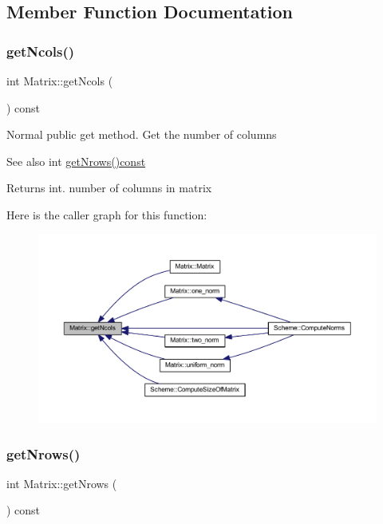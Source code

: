 \subsection{Member Function Documentation}
\mbox{\label{class_matrix_ae0a5f2154953b8d129a90b04f91d9079}} 
\subsubsection{\texorpdfstring{get\+Ncols()}{getNcols()}}
{\footnotesize\ttfamily int Matrix\+::get\+Ncols (\begin{DoxyParamCaption}{ }\end{DoxyParamCaption}) const}

Normal public get method. Get the number of columns \begin{DoxySeeAlso}{See also}
int \mbox{\hyperlink{class_matrix_a711f84a1c62832d9d197d78c9855a276}{get\+Nrows()const}} 
\end{DoxySeeAlso}
\begin{DoxyReturn}{Returns}
int. number of columns in matrix 
\end{DoxyReturn}
Here is the caller graph for this function\+:
\nopagebreak
\begin{figure}[H]
\begin{center}
\leavevmode
\includegraphics[width=350pt]{class_matrix_ae0a5f2154953b8d129a90b04f91d9079_icgraph}
\end{center}
\end{figure}
\mbox{\label{class_matrix_a711f84a1c62832d9d197d78c9855a276}} 
\subsubsection{\texorpdfstring{get\+Nrows()}{getNrows()}}
{\footnotesize\ttfamily int Matrix\+::get\+Nrows (\begin{DoxyParamCaption}{ }\end{DoxyParamCaption}) const}

